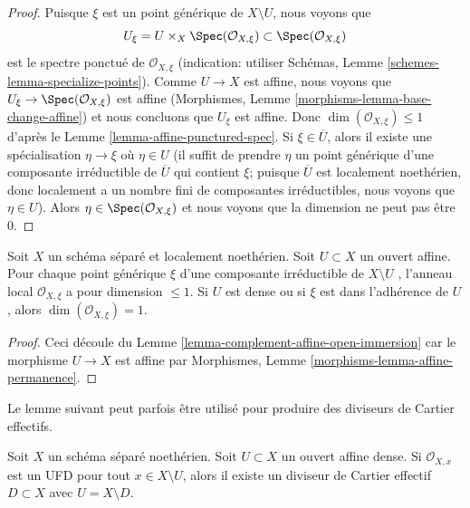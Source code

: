 \begin{proof}
Puisque  $\xi$  est un point générique de  $X \setminus U$, nous voyons que
$$
U_\xi = U \times_X \Spec(\mathcal{O}_{X, \xi}) \subset
\Spec(\mathcal{O}_{X, \xi})
$$
est le spectre ponctué de  $\mathcal{O}_{X, \xi}$  (indication: utiliser Schémas, Lemme
 \ref{schemes-lemma-specialize-points}). Comme  $U \to X$  est affine, nous voyons que  $U_\xi \to \Spec(\mathcal{O}_{X, \xi})$  est
affine (Morphismes, Lemme  \ref{morphisms-lemma-base-change-affine}) et nous concluons que  $U_\xi$  est
affine. Donc  $\dim(\mathcal{O}_{X, \xi}) \leq 1$  d'après le Lemme  \ref{lemma-affine-punctured-spec}. Si  $\xi \in \overline{U}$, alors il
existe une spécialisation  $\eta \to \xi$  où  $\eta \in U$  (il suffit de prendre
 $\eta$  un point générique d'une composante irréductible de  $\overline{U}$  qui
contient  $\xi$; puisque  $\overline{U}$  est localement noethérien, donc
localement a un nombre fini de composantes irréductibles, nous voyons que
 $\eta \in U$). Alors  $\eta \in \Spec(\mathcal{O}_{X, \xi})$  et nous voyons que la dimension ne peut pas être
 $0$.
\end{proof}

\begin{lemma}
\label{lemma-complement-affine-open}
Soit  $X$  un schéma séparé et localement noethérien. Soit  $U \subset X$  un
ouvert affine. Pour chaque point générique  $\xi$  d'une composante
irréductible de  $X \setminus U$ , l'anneau local  $\mathcal{O}_{X, \xi}$  a pour dimension
 $\leq 1$. Si  $U$  est dense ou si  $\xi$  est dans l'adhérence de
 $U$, alors  $\dim(\mathcal{O}_{X, \xi}) = 1$.
\end{lemma}

\begin{proof}
Ceci découle du Lemme  \ref{lemma-complement-affine-open-immersion}  car le morphisme  $U \to X$  est affine par
Morphismes, Lemme  \ref{morphisms-lemma-affine-permanence}.
\end{proof}

\noindent
Le lemme suivant peut parfois être utilisé pour produire des diviseurs de Cartier
effectifs.

\begin{lemma}
\label{lemma-complement-open-affine-effective-cartier-divisor}
Soit  $X$  un schéma séparé noethérien. Soit  $U \subset X$  un ouvert affine
dense. Si  $\mathcal{O}_{X, x}$  est un UFD pour tout  $x \in X \setminus U$, alors il existe un
diviseur de Cartier effectif  $D \subset X$  avec  $U = X \setminus D$.
\end{lemma}

